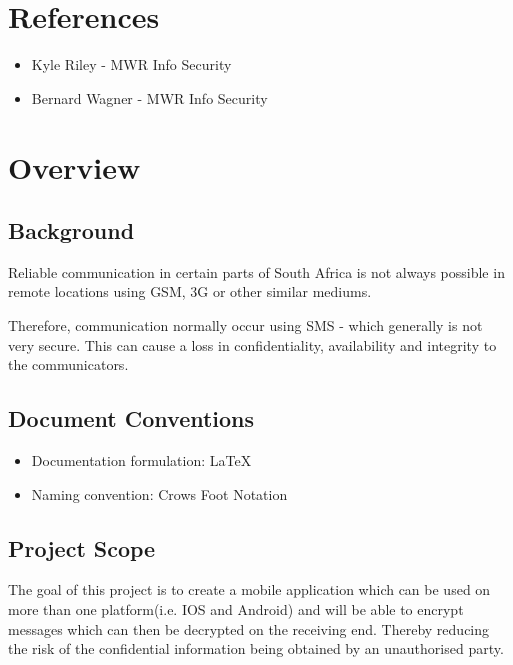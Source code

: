 \documentclass[12pt, a4paper]{article}
\begin{document}





\tableofcontents

\newpage


\section{References}
\begin{itemize}
\item{Kyle Riley - MWR Info Security}
\item{Bernard Wagner - MWR Info Security}
\end{itemize}

\section{Overview}

\subsection{Background}
Reliable communication in certain parts of South Africa is not always possible in remote locations using GSM, 3G or other similar mediums.

Therefore, communication normally occur using SMS - which generally is not very secure. This can cause a loss in confidentiality, availability and integrity to the communicators.



\subsection{Document Conventions}
\begin{itemize}
\item Documentation formulation: LaTeX
\item Naming convention: Crows Foot Notation
\end{itemize}


\subsection{Project Scope}
The goal of this project is to create a mobile application which can be used on more than one platform(i.e. IOS and Android) and will be able to encrypt messages which can then be decrypted on the receiving end. Thereby reducing the risk of the confidential information being obtained by an unauthorised party.













\end{document}
